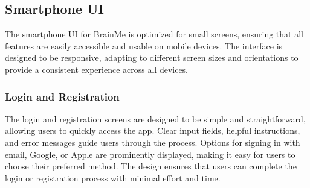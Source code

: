 \subsection{Smartphone UI}

The smartphone UI for BrainMe is optimized for small screens, ensuring that all features are easily accessible and usable on mobile devices. The interface is designed to be responsive, adapting to different screen sizes and orientations to provide a consistent experience across all devices.


\subsubsection{Login and Registration}

The login and registration screens are designed to be simple and straightforward, allowing users to quickly access the app. Clear input fields, helpful instructions, and error messages guide users through the process. Options for signing in with email, Google, or Apple are prominently displayed, making it easy for users to choose their preferred method. The design ensures that users can complete the login or registration process with minimal effort and time.

